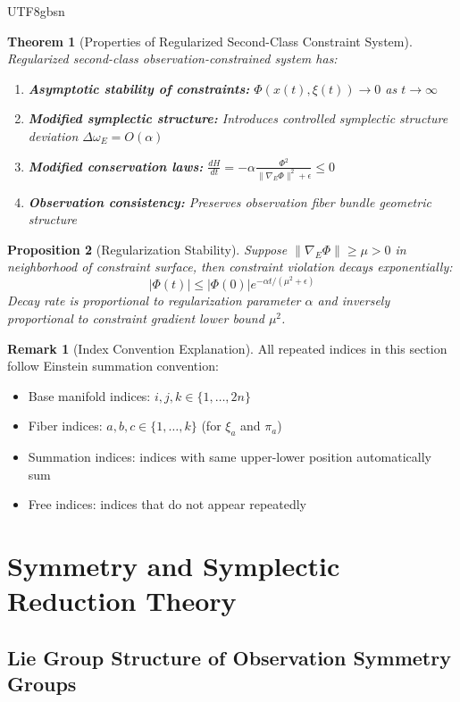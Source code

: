 \documentclass[a4paper,12pt]{extarticle}
\newtheorem{theorem}{Theorem}
\newtheorem{proposition}[theorem]{Proposition}
\theoremstyle{definition}
\newtheorem{remark}{Remark}
\begin{document}
\begin{CJK}{UTF8}{gbsn}
\begin{theorem}[Properties of Regularized Second-Class Constraint System]
Regularized second-class observation-constrained system has:
\begin{enumerate}
\item \textbf{Asymptotic stability of constraints:} $\Phi(x(t),\xi(t)) \to 0$ as $t \to \infty$
\item \textbf{Modified symplectic structure:} Introduces controlled symplectic structure deviation $\Delta\omega_E = O(\alpha)$
\item \textbf{Modified conservation laws:} $\frac{dH}{dt} = -\alpha\frac{\Phi^2}{\|\nabla_E\Phi\|^2 + \epsilon} \leq 0$
\item \textbf{Observation consistency:} Preserves observation fiber bundle geometric structure
\end{enumerate}
\end{theorem}

\begin{proposition}[Regularization Stability]
Suppose $\|\nabla_E\Phi\| \geq \mu > 0$ in neighborhood of constraint surface, then constraint violation decays exponentially:
$$|\Phi(t)| \leq |\Phi(0)|e^{-\alpha t/(\mu^2 + \epsilon)}$$
Decay rate is proportional to regularization parameter $\alpha$ and inversely proportional to constraint gradient lower bound $\mu^2$.
\end{proposition}

\begin{remark}[Index Convention Explanation]
All repeated indices in this section follow Einstein summation convention:
\begin{itemize}
\item Base manifold indices: $i,j,k \in \{1,\ldots,2n\}$
\item Fiber indices: $a,b,c \in \{1,\ldots,k\}$ (for $\xi_a$ and $\pi_a$)
\item Summation indices: indices with same upper-lower position automatically sum
\item Free indices: indices that do not appear repeatedly
\end{itemize}
\end{remark}



\section{Symmetry and Symplectic Reduction Theory}

\subsection{Lie Group Structure of Observation Symmetry Groups}


\end{CJK}
\end{document}
